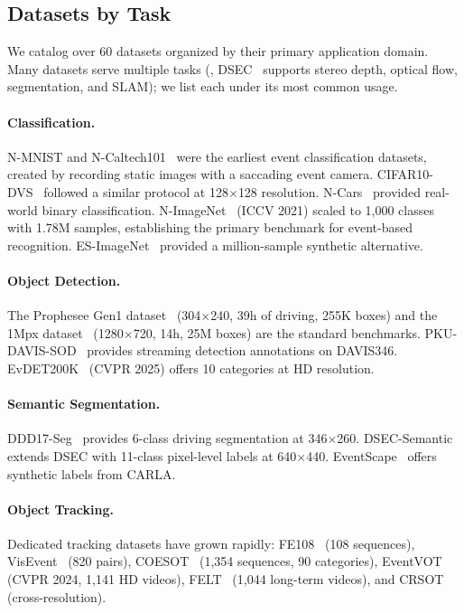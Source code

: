 \subsection{Datasets by Task}
\label{sec:data_bytask}

We catalog over 60 datasets organized by their primary application domain. Many datasets serve multiple tasks (\eg, DSEC~\cite{gehrig2021dsec} supports stereo depth, optical flow, segmentation, and SLAM); we list each under its most common usage.

\paragraph{Classification.} N-MNIST and N-Caltech101~\cite{orchard2015nmnist} were the earliest event classification datasets, created by recording static images with a saccading event camera. CIFAR10-DVS~\cite{li2017cifar10dvs} followed a similar protocol at 128$\times$128 resolution. N-Cars~\cite{sironi2018ncars} provided real-world binary classification. N-ImageNet~\cite{kim2021nimagenet} (ICCV 2021) scaled to 1,000 classes with 1.78M samples, establishing the primary benchmark for event-based recognition. ES-ImageNet~\cite{bi2021esimagenet} provided a million-sample synthetic alternative.

\paragraph{Object Detection.} The Prophesee Gen1 dataset~\cite{perot2020red} (304$\times$240, 39h of driving, 255K boxes) and the 1Mpx dataset~\cite{perot2020red} (1280$\times$720, 14h, 25M boxes) are the standard benchmarks. PKU-DAVIS-SOD~\cite{zhao2023sodformer} provides streaming detection annotations on DAVIS346. EvDET200K~\cite{wang2025mvheat} (CVPR 2025) offers 10 categories at HD resolution.

\paragraph{Semantic Segmentation.} DDD17-Seg~\cite{binas2017ddd17} provides 6-class driving segmentation at 346$\times$260. DSEC-Semantic~\cite{sun2022ess} extends DSEC with 11-class pixel-level labels at 640$\times$440. EventScape~\cite{gehrig2021ramnet} offers synthetic labels from CARLA.

\paragraph{Object Tracking.} Dedicated tracking datasets have grown rapidly: FE108~\cite{zhang2021fe108} (108 sequences), VisEvent~\cite{wang2023visevent} (820 pairs), COESOT~\cite{tang2022ceutrack} (1,354 sequences, 90 categories), EventVOT~\cite{wang2024hdetrack} (CVPR 2024, 1,141 HD videos), FELT~\cite{wang2024felt} (1,044 long-term videos), and CRSOT~\cite{tang2024crsot} (cross-resolution).

